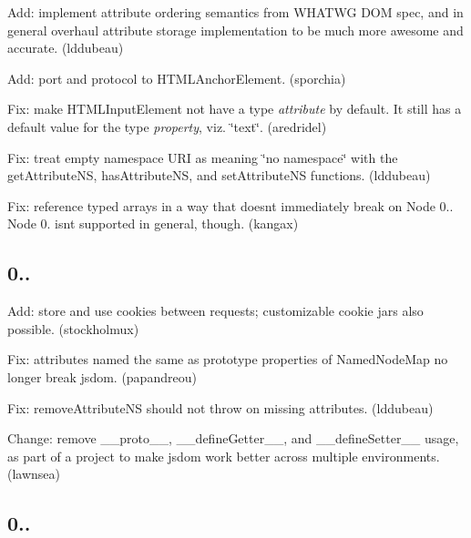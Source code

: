 \begin{DoxyItemize}
\item Add\+: implement attribute ordering semantics from W\+H\+A\+T\+WG D\+OM spec, and in general overhaul attribute storage implementation to be much more awesome and accurate. (lddubeau)
\item Add\+: {\ttfamily port} and {\ttfamily protocol} to {\ttfamily H\+T\+M\+L\+Anchor\+Element}. (sporchia)
\item Fix\+: make {\ttfamily H\+T\+M\+L\+Input\+Element} not have a {\ttfamily type} {\itshape attribute} by default. It still has a default value for the {\ttfamily type} {\itshape property}, viz. {\ttfamily \char`\"{}text\char`\"{}}. (aredridel)
\item Fix\+: treat empty namespace U\+RI as meaning \char`\"{}no namespace\char`\"{} with the {\ttfamily get\+Attribute\+NS}, {\ttfamily has\+Attribute\+NS}, and {\ttfamily set\+Attribute\+NS} functions. (lddubeau)
\item Fix\+: reference typed arrays in a way that doesn\textquotesingle{}t immediately break on Node 0.. Node 0. isn\textquotesingle{}t supported in general, though. (kangax)
\end{DoxyItemize}

\subsection*{0..}


\begin{DoxyItemize}
\item Add\+: store and use cookies between requests; customizable cookie jars also possible. (stockholmux)
\item Fix\+: attributes named the same as prototype properties of {\ttfamily Named\+Node\+Map} no longer break jsdom. (papandreou)
\item Fix\+: {\ttfamily remove\+Attribute\+NS} should not throw on missing attributes. (lddubeau)
\item Change\+: remove {\ttfamily \+\_\+\+\_\+proto\+\_\+\+\_\+}, {\ttfamily \+\_\+\+\_\+define\+Getter\+\_\+\+\_\+}, and {\ttfamily \+\_\+\+\_\+define\+Setter\+\_\+\+\_\+} usage, as part of a project to make jsdom work better across multiple environments. (lawnsea)
\end{DoxyItemize}

\subsection*{0..}


